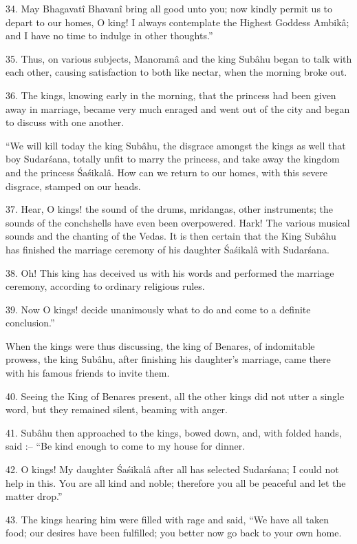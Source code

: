 34. May Bhagavat\^i Bhavan\^i bring all good unto you; now kindly permit us to depart to our homes, O king! I always contemplate the Highest Goddess Ambik\^a; and I have no time to indulge in other thoughts.''

35. Thus, on various subjects, Manoram\^a and the king Sub\^ahu began to talk with each other, causing satisfaction to both like nectar, when the morning broke out.

36. The kings, knowing early in the morning, that the princess had been given away in marriage, became very much enraged and went out of the city and began to discuss with one another.

``We will kill today the king Sub\^ahu, the disgrace amongst the kings as well that boy Sudar\'sana, totally unfit to marry the princess, and take away the kingdom and the princess \'Sa\'sikal\^a. How can we return to our homes, with this severe disgrace, stamped on our heads.

37. Hear, O kings! the sound of the drums, mridangas, other instruments; the sounds of the conchshells have even been overpowered. Hark! The various musical sounds and the chanting of the Vedas. It is then certain that the King Sub\^ahu has finished the marriage ceremony of his daughter \'Sa\'sikal\^a with Sudar\'sana.

38. Oh! This king has deceived us with his words and performed the marriage ceremony, according to ordinary religious rules.

39. Now O kings! decide unanimously what to do and come to a definite conclusion.''

When the kings were thus discussing, the king of Benares, of indomitable prowess, the king Sub\^ahu, after finishing his daughter's marriage, came there with his famous friends to invite them.

40. Seeing the King of Benares present, all the other kings did not utter a single word, but they remained silent, beaming with anger.

41. Sub\^ahu then approached to the kings, bowed down, and, with folded hands, said :-- ``Be kind enough to come to my house for dinner.

42. O kings! My daughter \'Sa\'sikal\^a after all has selected Sudar\'sana; I could not help in this. You are all kind and noble; therefore you all be peaceful and let the matter drop.''

43. The kings hearing him were filled with rage and said, ``We have all taken food; our desires have been fulfilled; you better now go back to your own home.

